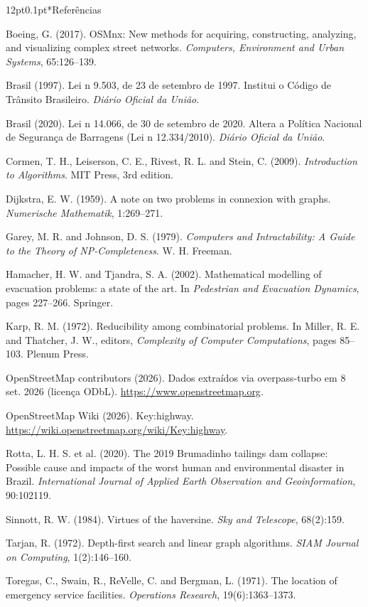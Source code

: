\documentclass[12pt,a4paper]{article}
\makeatletter
\renewcommand\section{\@startsection{section}{1}{\z@}%
  {12pt}{0.1pt}{\normalfont\fontsize{13}{15}\selectfont\bfseries}}
\newenvironment{referencias}%
  {\section*{Referências}\begin{list}{}{\leftmargin=0.5cm\itemindent=-0.5cm%
   \labelwidth=0pt\labelsep=0pt\itemsep=0pt\parsep=0pt\topsep=0pt}\setlength{\parskip}{6pt}}%
  {\end{list}}
\newcommand{\referencia}{\item\relax}
\makeatother
\begin{document}
\begin{referencias}
\referencia Boeing, G. (2017). OSMnx: New methods for acquiring, constructing, analyzing, and visualizing complex street networks. \emph{Computers, Environment and Urban Systems}, 65:126--139.

\referencia Brasil (1997). Lei n\textordmasculine{} 9.503, de 23 de setembro de 1997. Institui o Código de Trânsito Brasileiro. \emph{Diário Oficial da União}.

\referencia Brasil (2020). Lei n\textordmasculine{} 14.066, de 30 de setembro de 2020. Altera a Política Nacional de Segurança de Barragens (Lei n\textordmasculine{} 12.334/2010). \emph{Diário Oficial da União}.

\referencia Cormen, T. H., Leiserson, C. E., Rivest, R. L. and Stein, C. (2009). \emph{Introduction to Algorithms}. MIT Press, 3rd edition.

\referencia Dijkstra, E. W. (1959). A note on two problems in connexion with graphs. \emph{Numerische Mathematik}, 1:269--271.

\referencia Garey, M. R. and Johnson, D. S. (1979). \emph{Computers and Intractability: A Guide to the Theory of NP-Completeness}. W. H. Freeman.

\referencia Hamacher, H. W. and Tjandra, S. A. (2002). Mathematical modelling of evacuation problems: a state of the art. In \emph{Pedestrian and Evacuation Dynamics}, pages 227--266. Springer.

\referencia Karp, R. M. (1972). Reducibility among combinatorial problems. In Miller, R. E. and Thatcher, J. W., editors, \emph{Complexity of Computer Computations}, pages 85--103. Plenum Press.

\referencia OpenStreetMap contributors (2026). Dados extraídos via overpass-turbo em 8 set. 2026 (licença ODbL). \url{https://www.openstreetmap.org}.

\referencia OpenStreetMap Wiki (2026). Key:highway. \url{https://wiki.openstreetmap.org/wiki/Key:highway}.

\referencia Rotta, L. H. S. et al. (2020). The 2019 Brumadinho tailings dam collapse: Possible cause and impacts of the worst human and environmental disaster in Brazil. \emph{International Journal of Applied Earth Observation and Geoinformation}, 90:102119.

\referencia Sinnott, R. W. (1984). Virtues of the haversine. \emph{Sky and Telescope}, 68(2):159.

\referencia Tarjan, R. (1972). Depth-first search and linear graph algorithms. \emph{SIAM Journal on Computing}, 1(2):146--160.

\referencia Toregas, C., Swain, R., ReVelle, C. and Bergman, L. (1971). The location of emergency service facilities. \emph{Operations Research}, 19(6):1363--1373.
\end{referencias}
\end{document}

